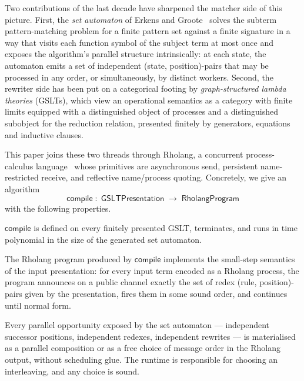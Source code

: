 \documentclass[11pt]{article}
\theoremstyle{plain}
\theoremstyle{definition}
\theoremstyle{remark}
\begin{document}
Two contributions of the last decade have sharpened the matcher side of this
picture. First, the \emph{set automaton} of Erkens and
Groote~\cite{ErkensGroote2021} solves the subterm pattern-matching problem
for a finite pattern set against a finite signature in a way that visits
each function symbol of the subject term at most once and exposes the
algorithm's parallel structure intrinsically: at each state, the automaton
emits a set of independent (state, position)-pairs that may be processed in
any order, or simultaneously, by distinct workers. Second, the rewriter
side has been put on a categorical footing by \emph{graph-structured lambda
theories} (GSLTs), which view an operational semantics as a category with
finite limits equipped with a distinguished object of processes and a
distinguished subobject for the reduction relation, presented finitely by
generators, equations and inductive clauses.

This paper joins these two threads through Rholang, a concurrent
process-calculus language~\cite{MeredithRadestock2005} whose primitives are
asynchronous send, persistent name-restricted receive, and reflective
name/process quoting. Concretely, we give an algorithm
\[
  \mathsf{compile} \;:\; \mathsf{GSLTPresentation}
                  \;\longrightarrow\; \mathsf{RholangProgram}
\]
with the following properties.
\begin{description}[leftmargin=2em,style=nextline]
  \item[Totality.] $\mathsf{compile}$ is defined on every finitely presented
       GSLT, terminates, and runs in time polynomial in the size of the
       generated set automaton.
  \item[Correctness.] The Rholang program produced by $\mathsf{compile}$
       implements the small-step semantics of the input presentation: for
       every input term encoded as a Rholang process, the program announces
       on a public channel exactly the set of redex (rule, position)-pairs
       given by the presentation, fires them in some sound order, and
       continues until normal form.
  \item[Parallelism preservation.] Every parallel opportunity exposed by the
       set automaton --- independent successor positions, independent
       redexes, independent rewrites --- is materialised as a parallel
       composition or as a free choice of message order in the Rholang
       output, without scheduling glue. The runtime is responsible for
       choosing an interleaving, and any choice is sound.
\end{description}
\end{document}
